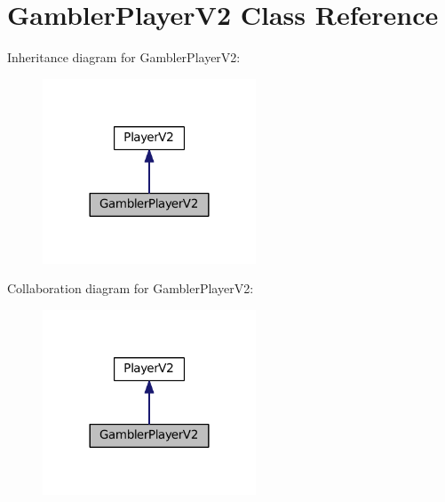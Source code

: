 \hypertarget{classGamblerPlayerV2}{}\section{Gambler\+Player\+V2 Class Reference}
\label{classGamblerPlayerV2}


Inheritance diagram for Gambler\+Player\+V2\+:\nopagebreak
\begin{figure}[H]
\begin{center}
\leavevmode
\includegraphics[width=180pt]{classGamblerPlayerV2__inherit__graph}
\end{center}
\end{figure}


Collaboration diagram for Gambler\+Player\+V2\+:\nopagebreak
\begin{figure}[H]
\begin{center}
\leavevmode
\includegraphics[width=180pt]{classGamblerPlayerV2__coll__graph}
\end{center}
\end{figure}
